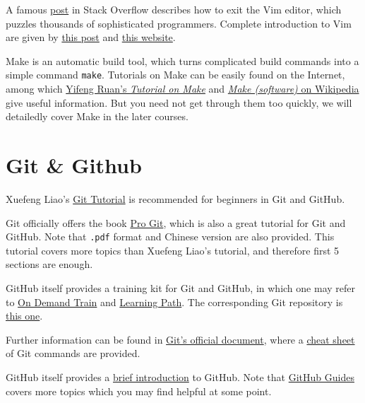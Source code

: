 \documentclass[english]{../TexTemplate/thesis}
\begin{document}
A famous \href{https://stackoverflow.com/questions/11828270/how-to-exit-the-vim-editor}{post} in Stack Overflow describes how to exit the Vim editor, which puzzles thousands of sophisticated programmers. Complete introduction to Vim are given by \href{http://www.jianshu.com/p/bcbe916f97e1}{this post} and \href{https://blog.interlinked.org/tutorials/vim_tutorial.html}{this website}.

Make is an automatic build tool, which turns complicated build commands into a simple command \verb"make". Tutorials on Make can be easily found on the Internet, among which \href{http://www.ruanyifeng.com/blog/2015/02/make.html}{Yifeng Ruan's \emph{Tutorial on Make}} and \href{https://en.wikipedia.org/wiki/Make_(software)}{\emph{Make (software)} on Wikipedia} give useful information.
But you need not get through them too quickly, we will detailedly cover Make in the later courses.

\section{Git \& Github}
Xuefeng Liao's \href{https://www.liaoxuefeng.com/wiki/0013739516305929606dd18361248578c67b8067c8c017b000/}{Git Tutorial} is recommended for beginners in Git and GitHub.

Git officially offers the book \href{https://git-scm.com/book/en/v2}{Pro Git}, which is also a great tutorial for Git and GitHub. Note that \verb".pdf" format and Chinese version are also provided. This tutorial covers more topics than Xuefeng Liao's tutorial, and therefore first 5 sections are enough.

GitHub itself provides a training kit for Git and GitHub, in which one may refer to \href{https://services.github.com/on-demand/}{On Demand Train} and \href{https://services.github.com/on-demand/resources/learning-path/}{Learning Path}. The corresponding Git repository is \href{https://github.com/github/training-kit}{this one}.

Further information can be found in \href{https://git-scm.com/doc}{Git's official document}, where a \href{https://services.github.com/on-demand/downloads/github-git-cheat-sheet.pdf}{cheat sheet} of Git commands are provided.

GitHub itself provides a \href{https://guides.github.com/activities/hello-world/}{brief introduction} to GitHub. Note that \href{https://guides.github.com/}{GitHub Guides} covers more topics which you may find helpful at some point.
\end{document}

